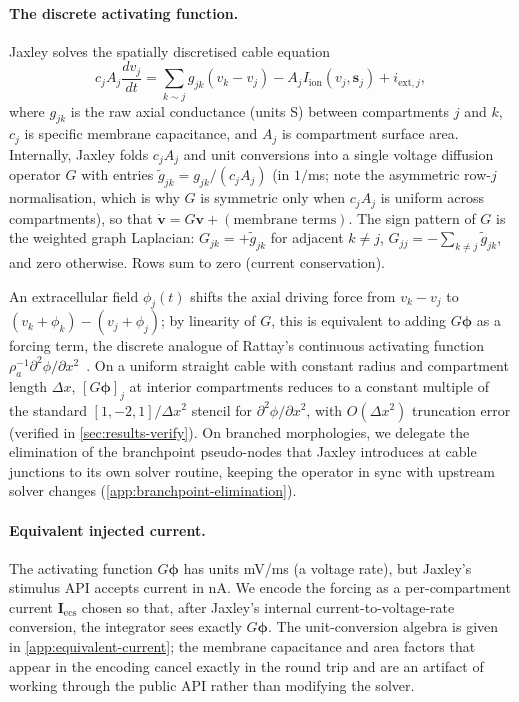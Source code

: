 \paragraph{The discrete activating function.}
Jaxley solves the spatially discretised cable equation
\[
  c_j A_j \frac{dv_j}{dt}
  = \sum_{k\sim j} g_{jk}(v_k - v_j) - A_j I_{\text{ion}}(v_j,\mathbf{s}_j) + i_{\text{ext},j},
\]
where $g_{jk}$ is the raw axial conductance (units S) between
compartments $j$ and $k$, $c_j$ is specific membrane capacitance, and
$A_j$ is compartment surface area. Internally, Jaxley folds $c_j A_j$
and unit conversions into a single voltage diffusion operator $G$ with
entries $\tilde g_{jk} = g_{jk} / (c_j A_j)$ (in $1/$ms; note the
asymmetric row-$j$ normalisation, which is why $G$ is symmetric only
when $c_j A_j$ is uniform across compartments), so that
$\dot{\mathbf{v}} = G\mathbf{v} + (\text{membrane terms})$. The sign
pattern of $G$ is the weighted graph Laplacian:
$G_{jk} = +\tilde g_{jk}$ for adjacent $k\neq j$,
$G_{jj} = -\sum_{k\neq j} \tilde g_{jk}$, and zero otherwise. Rows sum
to zero (current conservation).

An extracellular field $\phi_j(t)$ shifts the axial driving force from
$v_k - v_j$ to $(v_k+\phi_k)-(v_j+\phi_j)$; by linearity of $G$, this
is equivalent to adding $G\boldsymbol{\phi}$ as a forcing term, the
discrete analogue of Rattay's continuous activating function
$\rho_a^{-1}\partial^2\phi/\partial x^2$~\cite{rattay1986analysis}.
On a uniform straight cable with constant radius and compartment
length $\Delta x$, $[G\boldsymbol{\phi}]_j$ at interior compartments
reduces to a constant multiple of the standard
$[1,-2,1]/\Delta x^2$ stencil for $\partial^2\phi/\partial x^2$, with
$O(\Delta x^2)$ truncation error (verified in
\cref{sec:results-verify}).
On branched morphologies, we delegate the elimination of the
branchpoint pseudo-nodes that Jaxley introduces at cable junctions to
its own solver routine, keeping the operator in sync with upstream
solver changes (\cref{app:branchpoint-elimination}).

\paragraph{Equivalent injected current.}
The activating function $G\boldsymbol{\phi}$ has units mV/ms (a voltage
rate), but Jaxley's stimulus API accepts current in nA. We encode the
forcing as a per-compartment current $\mathbf{I}_{\text{ecs}}$ chosen
so that, after Jaxley's internal current-to-voltage-rate conversion,
the integrator sees exactly $G\boldsymbol{\phi}$. The unit-conversion
algebra is given in \cref{app:equivalent-current}; the membrane
capacitance and area factors that appear in the encoding cancel
exactly in the round trip and are an artifact of working through the
public API rather than modifying the solver.

